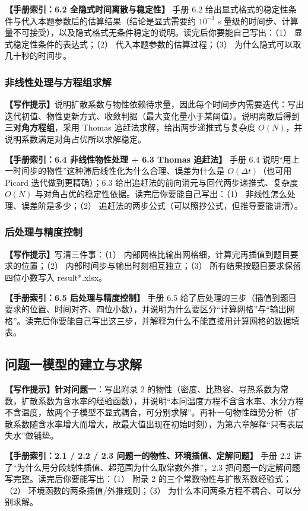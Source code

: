 \documentclass[12pt,a4paper]{article}
\newcommand{\prompt}[1]{\par\noindent\textbf{【写作提示】}#1\par}      %
\newcommand{\handbook}[2]{\par\noindent\textbf{【手册索引：#1】} #2\par}
\begin{document}
\handbook{6.2 全隐式时间离散与稳定性}{手册 6.2 给出显式格式的稳定性条件与代入本题参数后的估算结果（结论是显式需要约 $10^{-3}$ s 量级的时间步、计算量不可接受），以及隐式格式无条件稳定的说明。读完后你要能自己写出：（1） 显式稳定性条件的表达式；（2） 代入本题参数的估算过程；（3） 为什么隐式可以取几十秒的时间步。}

\subsubsection{非线性处理与方程组求解}

\prompt{说明扩散系数与物性依赖待求量，因此每个时间步内需要迭代：写出迭代初值、物性更新方式、收敛判据（最大变化量小于某阈值）。说明离散后得到\textbf{三对角方程组}，采用 Thomas 追赶法求解，给出两步递推式与复杂度 $O(N)$，并说明系数满足对角占优所以求解稳定。}

\handbook{6.4 非线性物性处理 + 6.3 Thomas 追赶法}{手册 6.4 说明“用上一时间步的物性”这种滞后线性化为什么合理、误差为什么是 $O(\Delta t)$（也可用 Picard 迭代做到更精确）；6.3 给出追赶法的前向消元与回代两步递推式、复杂度 $O(N)$ 与对角占优的稳定性依据。读完后你要能自己写出：（1） 非线性怎么处理、误差阶是多少；（2） 追赶法的两步公式（可以照抄公式，但推导要能讲清）。}

\subsubsection{后处理与精度控制}

\prompt{写清三件事：（1） 内部网格比输出网格细，计算完再插值到题目要求的位置；（2） 内部时间步与输出时刻相互独立；（3） 所有结果按题目要求保留四位小数写入 result*.xlsx。}

\handbook{6.5 后处理与精度控制}{手册 6.5 给了后处理的三步（插值到题目要求的位置、时间对齐、四位小数），并说明为什么要区分“计算网格”与“输出网格”。读完后你要能自己写出这三步，并解释为什么不能直接用计算网格的数据填表。}

\subsection{问题一模型的建立与求解}

\prompt{\textbf{针对问题一}：写出附录 2 的物性（密度、比热容、导热系数为常数，扩散系数为含水率的经验函数），并说明“本问温度方程不含含水率、水分方程不含温度，故两个子模型不显式耦合，可分别求解”。再补一句物性趋势分析（扩散系数随含水率增大而增大，故最大值出现在初始时刻），为第六章解释“只有表层失水”做铺垫。}

\handbook{2.1 / 2.2 / 2.3 问题一的物性、环境插值、定解问题}{手册 2.2 讲了“为什么用分段线性插值、超范围为什么取常数外推”，2.3 把问题一的定解问题写完整。读完后你要能写出：（1） 附录 2 的三个常数物性与扩散系数经验式；（2） 环境函数的两条插值/外推规则；（3） 为什么本问两条方程不耦合、可以分别求解。}
\end{document}
